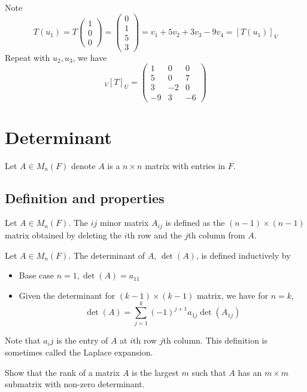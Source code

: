 \documentclass[11pt]{article}
\begin{document}
\begin{solution}
  Note \[T(u_1)=T\begin{pmatrix}1\\0\\0\end{pmatrix}=\begin{pmatrix}0\\1\\5\\3\end{pmatrix}=v_1+5v_2+3v_3-9v_4=[T(u_1)]_V\]
  Repeat with \(u_2,u_3\), we have
  \[{}_V[T]_U=\begin{pmatrix}1&0&0\\5&0&7\\3&-2&0\\-9&3&-6\end{pmatrix}\]
\end{solution}
\section{Determinant}
Let \(A\in M_n(F)\) denote \(A\) is a \(n\times n\) matrix with entries in \(F\).
\subsection{Definition and properties}
\begin{definition}
  Let \(A\in M_n(F)\). The \(ij\) minor matrix \(A_{ij}\) is defined as the \((n-1)\times(n-1)\) matrix obtained by deleting the \(i\)th row and the \(j\)th column from \(A\).
\end{definition}

\begin{definition}[Determinant]
  Let \(A\in M_n(F)\). The determinant of \(A\), \(\det(A)\), is defined inductively by
  \begin{itemize}
    \item Base case \(n=1, \det(A)=a_11\)
    \item Given the determinant for \((k-1)\times(k-1)\) matrix, we have for \(n=k\),
    \[\det(A)=\sum_{j=1}^{k}(-1)^{j+1}a_{1j}\det(A_{1j})\]
  \end{itemize} 
\end{definition}
Note that \(a_ij\) is the entry of \(A\) at \(i\)th row \(j\)th column. This definition is sometimes called the Laplace expansion.


\begin{problem}
  Show that the rank of a matrix \(A\) is the largest \(m\) such that \(A\) has an \(m\times m\) submatrix with non-zero determinant.
\end{problem}
\end{document}
